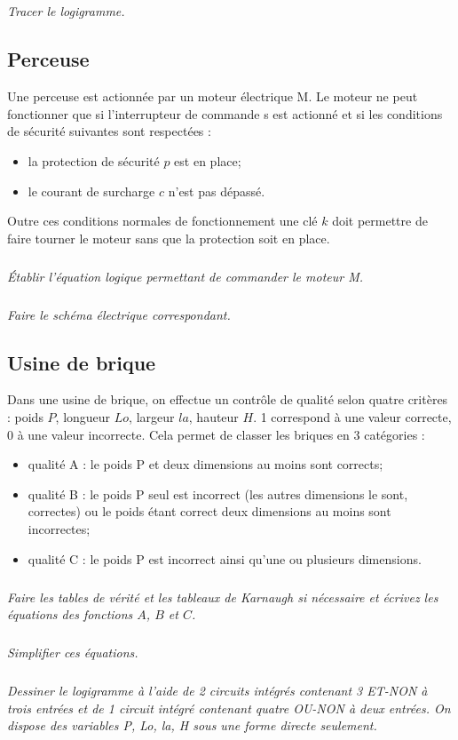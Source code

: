 \documentclass[10pt]{article}
\begin{document}
\subparagraph{}
\textit{Tracer le logigramme.}


\subsection*{Perceuse}
\setcounter{subparagraph}{0}
Une perceuse est actionnée par un moteur électrique M. Le moteur ne peut fonctionner que si l’interrupteur de commande s est actionné et si les conditions de sécurité suivantes sont respectées :
\begin{itemize}
\item la protection de sécurité $p$ est en place;
\item le courant de surcharge $c$ n’est pas dépassé.
\end{itemize}

Outre ces conditions normales de fonctionnement une clé $k$ doit permettre de faire tourner le moteur sans que la protection soit en place.

\subparagraph{}
\textit{Établir l’équation logique permettant de commander le moteur M.}

\subparagraph{}
\textit{Faire le schéma électrique correspondant.}

\subsection*{Usine de brique}
\setcounter{subparagraph}{0}
Dans une usine de brique, on effectue un contrôle de qualité selon quatre 
critères : poids $P$, longueur $Lo$, largeur $la$, hauteur $H$. 1 correspond à une valeur correcte, 0 à une valeur incorrecte. Cela permet de classer les briques en 3 catégories :
\begin{itemize}
\item qualité A : le poids P et deux dimensions au moins sont corrects;
\item qualité B : le poids P seul est incorrect (les autres dimensions le sont, correctes) ou le poids étant correct deux dimensions au moins sont incorrectes;
\item qualité C : le poids P est incorrect ainsi qu’une ou plusieurs dimensions.
\end{itemize}

\subparagraph{}
\textit{Faire les tables de vérité et les tableaux de Karnaugh si nécessaire et écrivez les équations des fonctions $A$, $B$ et $C$.}

\subparagraph{}
\textit{Simplifier ces équations.}


\subparagraph{}
\textit{Dessiner le logigramme à l’aide de 2 circuits intégrés contenant 3 ET-NON à trois entrées et de 1 circuit intégré contenant quatre OU-NON à deux entrées. On dispose des variables P, Lo, la, H sous une forme directe seulement.}
\end{document}
